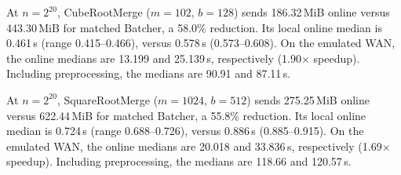 At $n=2^{20}$, CubeRootMerge ($m=102$, $b=128$) sends 186.32\,MiB online versus 443.30\,MiB for matched Batcher, a 58.0\% reduction. Its local online median is 0.461\,s (range 0.415--0.466), versus 0.578\,s (0.573--0.608).
On the emulated WAN, the online medians are 13.199 and 25.139\,s, respectively (1.90$\times$ speedup). Including preprocessing, the medians are 90.91 and 87.11\,s.

At $n=2^{20}$, SquareRootMerge ($m=1024$, $b=512$) sends 275.25\,MiB online versus 622.44\,MiB for matched Batcher, a 55.8\% reduction. Its local online median is 0.724\,s (range 0.688--0.726), versus 0.886\,s (0.885--0.915).
On the emulated WAN, the online medians are 20.018 and 33.836\,s, respectively (1.69$\times$ speedup). Including preprocessing, the medians are 118.66 and 120.57\,s.

